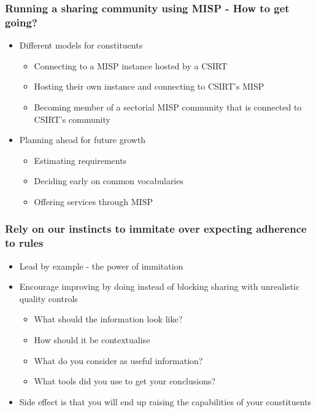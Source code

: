 \begin{frame}
\frametitle{Running a sharing community using MISP - How to get going?}
\begin{itemize}
	\item Different models for constituents
	\begin{itemize}
		\item Connecting to a MISP instance hosted by a CSIRT
		\item Hosting their own instance and connecting to CSIRT's MISP
		\item Becoming member of a sectorial MISP community that is connected to CSIRT's community
	\end{itemize}
	\item Planning ahead for future growth
	\begin{itemize}
		\item Estimating requirements
		\item Deciding early on common vocabularies
		\item Offering services through MISP
	\end{itemize}
\end{itemize}
\end{frame}

\begin{frame}
\frametitle{Rely on our instincts to immitate over expecting adherence to rules}
\begin{itemize}
	\item Lead by example - the power of immitation
	\item Encourage improving by doing instead of blocking sharing with unrealistic quality controls
	\begin{itemize}
		\item What should the information look like?
		\item How should it be contextualise
		\item What do you consider as useful information?
		\item What tools did you use to get your conclusions?
	\end{itemize}
	\item Side effect is that you will end up raising the capabilities of your constituents
\end{itemize}
\end{frame}


